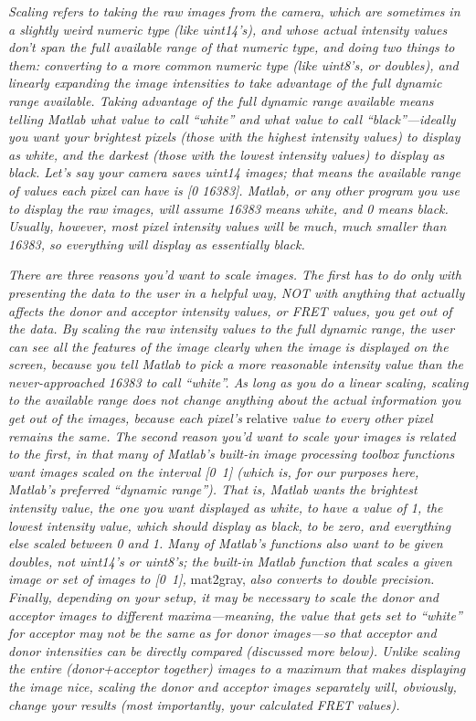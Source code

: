 \documentclass[11pt]{article}
\begin{document}
{\it Scaling refers to taking the raw images from the camera, which are sometimes in a slightly weird numeric type (like uint14's), and whose actual intensity values don't span the full available range of that numeric type, and doing two things to them: converting to a more common numeric type (like uint8's, or doubles), and linearly expanding the image intensities to take advantage of the full dynamic range available.  Taking advantage of the full dynamic range available means telling Matlab what value to call ``white'' and what value to call ``black''---ideally you want your brightest pixels (those with the highest intensity values) to display as white, and the darkest (those with the lowest intensity values) to display as black.  Let's say your camera saves uint14 images; that means the available range of values each pixel can have is [0 16383].  Matlab, or any other program you use to display the raw images, will assume 16383 means white, and 0 means black.  Usually, however, most pixel intensity values will be much, much smaller than 16383, so everything will display as essentially black.}

{\it There are three reasons you'd want to scale images.  The first has to do only with presenting the data to the user in a helpful way, NOT with anything that actually affects the donor and acceptor intensity values, or FRET values, you get out of the data.  By scaling the raw intensity values to the full dynamic range, the user can see all the features of the image clearly when the image is displayed on the screen, because you tell Matlab to pick a more reasonable intensity value than the never-approached 16383 to call ``white''.  As long as you do a linear scaling, scaling to the available range does not change anything about the actual information you get out of the images, because each pixel's} relative {\it value to every other pixel remains the same.  The second reason you'd want to scale your images is related to the first, in that many of Matlab's built-in image processing toolbox functions want images scaled on the interval [0~1] (which is, for our purposes here, Matlab's preferred ``dynamic range'').  That is, Matlab wants the brightest intensity value, the one you want displayed as white, to have a value of 1, the lowest intensity value, which should display as black, to be zero, and everything else scaled between 0 and 1. Many of Matlab's functions also want to be given doubles, not uint14's or uint8's; the built-in Matlab function that scales a given image or set of images to [0~1],} mat2gray, {\it also converts to double precision.  Finally, depending on your setup, it may be necessary to scale the donor and acceptor images to different maxima---meaning, the value that gets set to ``white'' for acceptor may not be the same as for donor images---so that acceptor and donor intensities can be directly compared (discussed more below).  Unlike scaling the entire (donor+acceptor together) images to a maximum that makes displaying the image nice, scaling the donor and acceptor images separately will, obviously, change your results (most importantly, your calculated FRET values).}
\end{document}
